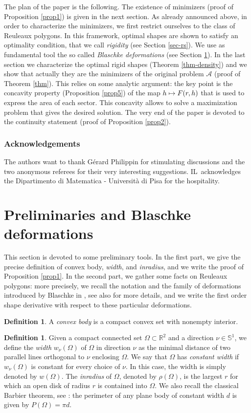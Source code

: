 \documentclass[11pt]{article}
\numberwithin{equation}{section}
\let\mathcal\mathscr
\newcommand\mto{\mathchoice{\longmapsto}{\mapsto}{\mapsto}{\mapsto}}
\theoremstyle{plain}
\theoremstyle{definition}
\newtheorem{definition}[theorem]{Definition}
\newcommand\A{\mathcal A}
\let\Om\Omega
\begin{document}
The plan of the paper is the following. The existence of minimizers (proof of Proposition \ref{prop1}) is given in the next section. As already announced above, in order to characterize the minimizers, we first restrict ourselves to the class of Reuleaux polygons. In this framework, optimal shapes are shown to satisfy an optimality condition, that we call \emph{rigidity} (see Section \ref{sec-rs}). We use as fundamental tool the so called \emph{Blaschke deformations} (see Section \ref{sec-prel}). In the last section we characterize the optimal rigid shapes (Theorem \ref{thm-density}) and we show that actually they are the minimizers of the original problem $\A$ (proof of Theorem \ref{thm}). {This relies on some analytic argument: the key
point is the concavity property (Proposition \ref{prop5})
of the map $h\mto F(r,h)$ that is used to express the area of
each sector. This concavity allows to solve a maximization problem that gives the desired solution.}
The very end of the paper is devoted to the continuity statement (proof of Proposition \ref{prop2}).

\subsubsection*{Acknowledgements}
The authors want to thank Gérard Philippin for stimulating discussions and the two anonymous referees for their very interesting suggestions. IL~acknowledges the Dipartimento di Matematica - Università di Pisa for the hospitality.

\section{Preliminaries and Blaschke deformations}\label{sec-prel}
This section is devoted to some preliminary tools. In the first part, we give the precise definition of {convex body}, \emph{width}, and \emph{inradius}, and we write the proof of Proposition \ref{prop1}. In the second part, we gather some facts on Reuleaux polygons: more precisely, we recall the notation and the family of deformations introduced by Blaschke in \cite{Bla},
see also \cite{KM} for more details, and we write the first order shape derivative with respect to these particular deformations.
{\begin{definition}
A \emph{convex body} is a compact convex set with nonempty interior.
\end{definition}}
\begin{definition}
Given a {compact connected} set $\Omega\subset \mathbb R^2$ and a direction $\nu \in \mathbb S^1$, we define the \emph{width} $w_\nu(\Omega)$ of $\Omega$ in direction $\nu$ as the minimal distance of two parallel lines orthogonal to $\nu$ enclosing $\Omega$. We say that $\Omega$ has \emph{constant width} if $w_\nu(\Omega)$ is constant for every choice of $\nu$. In this case, the width is simply denoted by $w(\Omega)$.
The \emph{inradius} of $\Omega$, denoted by $\rho(\Omega)$, is the largest $r$ for which an open disk of radius $r$ is contained into $\Omega$. We also recall the classical Barbier theorem, see
\cite{CG}: the perimeter of any plane body of constant width $d$ is given by $P(\Om)=\pi d$.
\end{definition}
\end{document}

